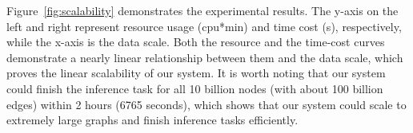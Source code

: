 \documentclass[conference]{IEEEtran}
\begin{document}
Figure~\ref{fig:scalability} demonstrates the experimental results. 
The y-axis on the left and right represent resource usage (cpu*min) and time cost (s), respectively, while the x-axis is the data scale.
Both the resource and the time-cost curves demonstrate a nearly linear relationship between them and the data scale, which proves the linear scalability of our system.
It is worth noting that our system could finish the inference task for all 10 billion nodes (with about 100 billion edges) within 2 hours (6765 seconds), which shows that our system could scale to extremely large graphs and finish inference tasks efficiently.




\end{document}
